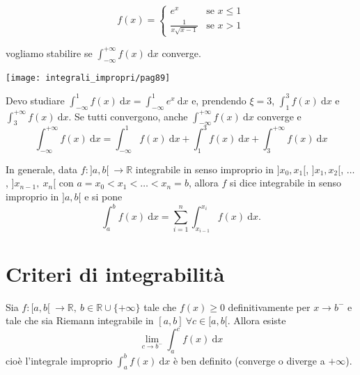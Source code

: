 \begin{exbar}
\begin{example}
	\begin{equation*}
		f(x)= 
		\begin{cases}
			e^x & \text{se } x \leq 1 
			\\
			\frac{1}{x \sqrt{x-1}} & \text{se } x>1
		\end{cases}
	\end{equation*}
	
	vogliamo stabilire se $\int_{-\infty}^{+\infty} f(x) \ \mathrm{d}x$ converge.
	\begin{center}
		\texttt{[image: integrali\_impropri/pag89]}
		\label{fig:pag89}
	\end{center}
	
	Devo studiare $\int_{-\infty}^{1} f(x) \ \mathrm{d}x = \int_{-\infty}^{1} e^x \ \mathrm{d}x$ e, prendendo $\xi=3$,  $\int_{1}^{3} f(x) \ \mathrm{d}x$ e $\int_{3}^{+\infty} f(x) \ \mathrm{d}x$. Se tutti convergono, anche $\int_{-\infty}^{+\infty} f(x) \ \mathrm{d}x$ converge e 
	\begin{equation*}
		\int_{-\infty}^{+\infty} f(x) \ \mathrm{d}x = \int_{-\infty}^{1} f(x) \ \mathrm{d}x + \int_{1}^{3} f(x) \ \mathrm{d}x + \int_{3}^{+\infty} f(x) \ \mathrm{d}x
	\end{equation*}
\end{example}
\end{exbar}

In generale, data $f:]a,b[ \ \rightarrow \mathbb{R}$ integrabile in senso improprio in $]x_0,x_1[$, $]x_1,x_2[$, $\ldots$, $]x_{n-1}, \ x_n[$ con $a = x_0 < x_1 < \ldots < x_n = b$, allora $f$ si dice integrabile in senso improprio in $]a,b[$ e si pone 
\begin{equation*}
	\int_{a}^{b} f(x) \ \mathrm{d}x= \sum_{i=1}^{n} \int_{x_{i-1}}^{x_i} f(x) \ \mathrm{d}x.
\end{equation*}

\section{Criteri di integrabilità}
\begin{proposition}
	\label{pr: integrabilità definita}
	Sia $f:[a,b[ \ \rightarrow \mathbb{R}, \ b \in \mathbb{R} \cup \{+\infty\}$ tale che $f(x) \geq 0$ definitivamente per $x \rightarrow b^-$ e tale che sia Riemann integrabile in $[a,b] \ \forall c \in [a,b[$. Allora esiste
	\begin{equation*}
		\lim_{c \rightarrow b^-} \int_{a}^{c} f(x) \ \mathrm{d}x
 	\end{equation*}
	cioè l'integrale improprio $\int_{a}^{b} f(x) \ \mathrm{d}x$ è ben definito (converge o diverge a $+\infty$).
\end{proposition}

